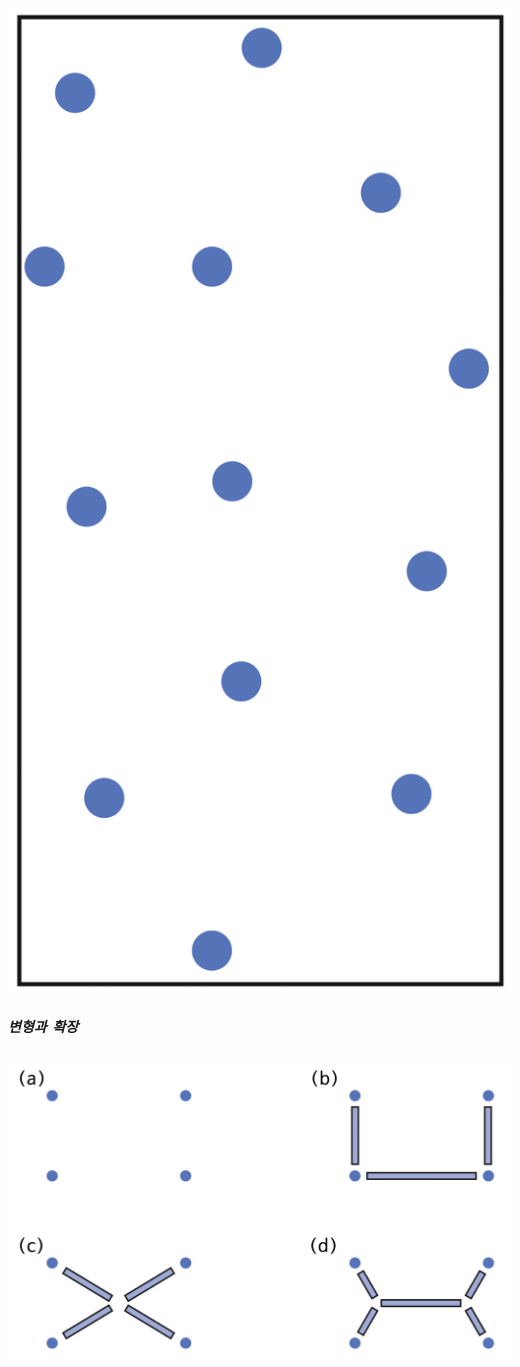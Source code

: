 \documentclass[]{article}
\begin{document}
\includegraphics{csunplugged/04-part/img/ch16-steiner/15-steiner-04-drill-sites-02.png}

\subparagraph{변형과 확장}\label{section-219}

\includegraphics{csunplugged/04-part/img/ch16-steiner/15-steiner-05-variations.png}
\end{document}
